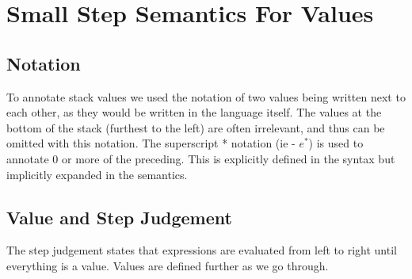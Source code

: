 \documentclass{article}
\begin{document}
\section{Small Step Semantics For Values}
\subsection{Notation}
To annotate stack values we used the notation of two values being written next to each other, as they would be written in the language itself. The values at the bottom of the stack (furthest to the left) are often irrelevant, and thus can be omitted with this notation. The superscript * notation (ie - $e^*$) is used to annotate 0 or more of the preceding. This is explicitly defined in the syntax but implicitly expanded in the semantics.

\subsection{Value and Step Judgement}
The step judgement states that expressions are evaluated from left to right until everything is a value. Values are defined further as we go through.
{
    \centering
    \def \MathparLineskip {\lineskip=0.43cm}
}
\end{document}
